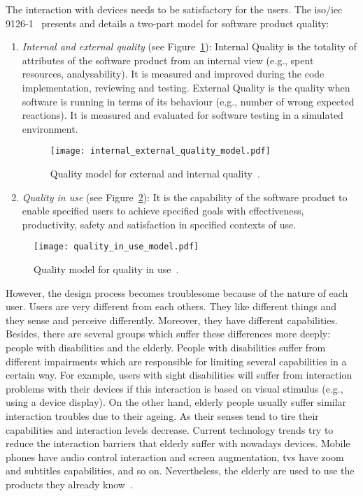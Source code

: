 The interaction with devices needs to be satisfactory for the users. The 
\acs{iso}/\acs{iec} 9126-1~\citep{isoiec1} presents and details a two-part model 
for software product quality:

\begin{enumerate}
  \item \textit{Internal and external quality} (see Figure~\ref{fig:ie_q_model}):
  Internal Quality is the totality of attributes of the software product from an
  internal view (e.g., spent resources, analysability). It is measured and
  improved during the code implementation, reviewing and testing. External 
  Quality is the quality when software is running in terms of its behaviour 
  (e.g., number of wrong expected reactions). It is measured and evaluated for 
  software testing in a simulated environment.
  
\begin{figure}[H]
\centering
\texttt{[image: internal\_external\_quality\_model.pdf]}
\caption{Quality model for external and internal quality~\citep{isoiec1}.}
\label{fig:ie_q_model}
\end{figure}
  
  \item \textit{Quality in use} (see Figure~\ref{fig:qu_model}): It is the capability of
  the software product to enable specified users to achieve specified goals with
  effectiveness, productivity, safety and satisfaction in specified contexts of
  use.
\end{enumerate}


\begin{figure}[H]
\centering
\texttt{[image: quality\_in\_use\_model.pdf]}
\caption{Quality model for quality in use~\citep{isoiec1}.}
\label{fig:qu_model}
\end{figure}

However, the design process becomes troublesome because of the nature of each
user. Users are very different from each others. They like different things and they
sense and perceive differently. Moreover, they have different capabilities.
Besides, there are several groups which suffer these differences more deeply:
people with disabilities and the elderly. People with disabilities suffer from 
different impairments which are responsible for limiting several capabilities 
in a certain way. For example, users with sight disabilities will suffer from 
interaction problems with their devices if this interaction is based on visual 
stimulus (e.g., using a device display). On the other hand, elderly people 
usually suffer similar interaction troubles due to their ageing. As their 
senses tend to tire their capabilities and interaction levels decrease. Current 
technology trends try to reduce the interaction barriers that elderly suffer 
with nowadays devices. Mobile phones have audio control interaction and screen 
augmentation, \acsp{tv} have zoom and subtitles capabilities, and so on. 
Nevertheless, the elderly are used to use the products they already 
know~\citep{roupa_use_2010}\citep{elderly_tech}.

